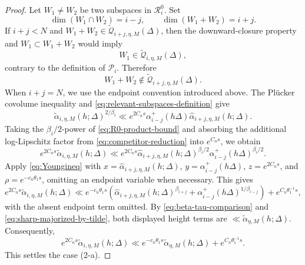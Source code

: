 \documentclass[reqno,11pt]{amsart}
\numberwithin{equation}{section}
\theoremstyle{definition}
\theoremstyle{remark}
\begin{document}
\begin{proof}
Let $W_1\ne W_2$ be two subspaces in $\mathcal R_i^0$. Set
$$
\dim(W_1\cap W_2)=i-j,
\qquad
\dim(W_1+W_2)=i+j.
$$
If $i+j<N$ and
$W_1+W_2\in
\widetilde{\mathscr Q}_{i+j,\eta,M}(\Delta)$,
then the downward-closure property and
$W_1\subset W_1+W_2$ would imply
\[
W_1\in\widetilde{\mathscr Q}_{i,\eta,M}(\Delta),
\]
contrary to the definition of $\mathcal P_i$. Therefore
\[
W_1+W_2
\notin
\widetilde{\mathscr Q}_{i+j,\eta,M}(\Delta).
\]
When $i+j=N$, we use the endpoint convention introduced above.
The Pl\"ucker covolume inequality and
\eqref{eq:relevant-subspaces-definition} give
\begin{equation}\label{eq:R0-product-bound}
\widetilde\alpha_{i,\eta,M}(h;\Delta)^{2/\beta_i}
\ll
e^{2C_ns}
\alpha_{i-j}^+(h\Delta)
\widehat\alpha_{i+j,\eta,M}(h;\Delta).
\end{equation}
Taking the $\beta_i/2$-power of
\eqref{eq:R0-product-bound} and absorbing the additional log-Lipschitz
factor from \eqref{eq:competitor-reduction} into $e^{C_ns}$, we obtain
$$
e^{2C_ns}\widetilde\alpha_{i,\eta,M}(h;\Delta)\ll e^{2C_ns}
\widehat\alpha_{i+j,\eta,M}(h;\Delta)^{\beta_i/2}
\alpha_{i-j}^+(h\Delta)^{\beta_i/2}.
$$
Apply \eqref{eq:Youngineq} with
$x=\widehat\alpha_{i+j,\eta,M}(h;\Delta)$,
$y=\alpha_{i-j}^+(h\Delta)$, $z=e^{2C_ns}$, and
$\rho=e^{-c_n\theta_1s}$, omitting an endpoint variable when necessary.
This gives
$$
e^{2C_ns}\widetilde\alpha_{i,\eta,M}(h;\Delta)
\ll
 e^{-c_n\theta_1 s}
\left(
\widehat\alpha_{i+j,\eta,M}(h;\Delta)^{\beta_{i+j}}
+
\alpha_{i-j}^+(h\Delta)^{1/\beta_{i-j}}
\right)
+e^{C_n\theta_1^{-1}s},
$$
with the absent endpoint term omitted. By \eqref{eq:beta-tau-comparison} and
\eqref{eq:sharp-majorized-by-tilde}, both displayed height terms are
$\ll \widetilde\alpha_{\eta,M}(h;\Delta)$. Consequently,
\begin{equation}\label{eq:R0-contraction}
e^{2C_ns}\widetilde\alpha_{i,\eta,M}(h;\Delta)
\ll e^{-c_n\theta_1 s}\widetilde\alpha_{\eta,M}(h;\Delta)
+e^{C_n\theta_1^{-1}s}.
\end{equation}
This settles the case (2-a).



\end{proof}
\end{document}
